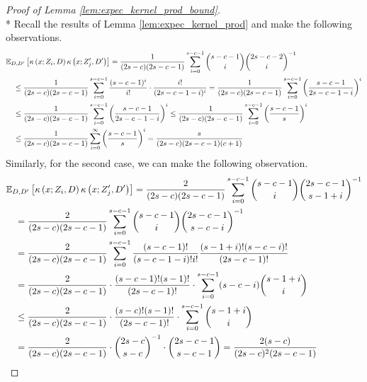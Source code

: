 \begin{proof}[Proof of Lemma \ref{lem:expec_kernel_prod_bound}]\mbox{}\\*
    Recall the results of Lemma \ref{lem:expec_kernel_prod} and make the following observations.
    \begin{equation}
        \begin{aligned}
            & \mathbb{E}_{D, D^{\prime}}\left[\kappa\left(x; Z_{i}, D\right)\kappa\left(x; Z_{j}^{\prime}, D^{\prime}\right)\right]
            = \frac{1}{(2s - c)(2s-c-1)}\sum_{i = 0}^{s - c - 1}\binom{s - c - 1}{i}\binom{2s - c - 2}{i}^{-1}\\
            & \quad \leq \frac{1}{(2s - c)(2s-c-1)}\sum_{i = 0}^{s - c - 1}\frac{(s - c - 1)^{i}}{i!} \cdot \frac{i!}{(2s - c - 1 - i)^{i}}
            = \frac{1}{(2s - c)(2s-c-1)}\sum_{i = 0}^{s - c - 1}\left(\frac{s - c - 1}{2s - c - 1 - i}\right)^{i}\\
            & \quad \leq \frac{1}{(2s - c)(2s-c-1)}\sum_{i = 0}^{s - c - 1}\left(\frac{s - c - 1}{2s - c - 1 - i}\right)^{i}
            \leq \frac{1}{(2s - c)(2s-c-1)}\sum_{i = 0}^{s - c - 1}\left(\frac{s - c - 1}{s}\right)^{i}\\
            & \quad \leq \frac{1}{(2s - c)(2s-c-1)}\sum_{i = 0}^{\infty}\left(\frac{s - c - 1}{s}\right)^{i}
            = \frac{s}{(2s - c)(2s-c-1)(c+1)}
        \end{aligned}
    \end{equation}
    Similarly, for the second case, we can make the following observation.
    \begin{equation}
        \begin{aligned}
            & \mathbb{E}_{D, D^{\prime}}\left[\kappa\left(x; Z_{i}, D\right)\kappa\left(x; Z_{j}^{\prime}, D^{\prime}\right)\right]
            = \frac{2}{(2s-c)(2s-c-1)} \sum_{i = 0}^{s-c-1} \binom{s - c - 1}{i}\binom{2s - c - 1}{s-1+i}^{-1}\\
            & \quad = \frac{2}{(2s-c)(2s-c-1)} \sum_{i = 0}^{s-c-1} \binom{s - c - 1}{i}\binom{2s - c - 1}{s - c - i}^{-1}\\
            & \quad = \frac{2}{(2s-c)(2s-c-1)} \sum_{i = 0}^{s-c-1} \frac{(s - c - 1)!}{(s - c - 1 - i)! i!}\frac{(s - 1 + i)! (s - c - i)!}{(2s - c - 1)!}\\
            & \quad = \frac{2}{(2s-c)(2s-c-1)} \cdot \frac{(s - c - 1)!(s-1)!}{(2s - c - 1)!} \cdot \sum_{i = 0}^{s-c-1} (s-c-i) \binom{s-1+i}{i}\\
            & \quad \leq \frac{2}{(2s-c)(2s-c-1)} \cdot \frac{(s - c)!(s-1)!}{(2s - c - 1)!} \cdot \sum_{i = 0}^{s-c-1} \binom{s-1+i}{i}\\
            & \quad = \frac{2}{(2s-c)(2s-c-1)} \cdot \binom{2s-c}{s-c}^{-1} \cdot \binom{2s - c - 1}{s-c-1}
            = \frac{2(s-c)}{(2s-c)^{2}(2s-c-1)}
        \end{aligned}
    \end{equation}
\end{proof}

